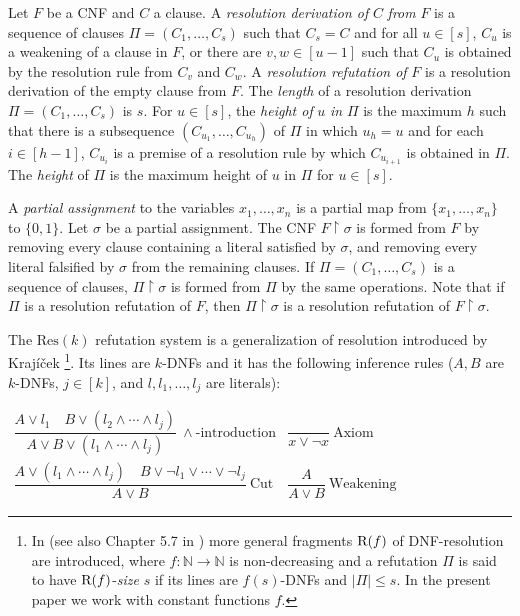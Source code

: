 Let $F$ be a CNF and $C$ a clause. A \emph{resolution derivation of} $C$ \emph{from} $F$ is a sequence of clauses $\Pi = (C_1, \ldots , C_s)$ such that $C_s = C$ and for all $u \in [s]$, $C_u$ is a weakening of a clause in $F$, or there are $v,w \in [u-1]$ such that $C_u$ is obtained by the resolution rule from $C_v$ and $C_w$. 
A \emph{resolution refutation of} $F$ is a resolution derivation of the empty clause from $F$.
The \emph{length} of a resolution derivation $\Pi = (C_1, \ldots , C_s)$ is $s$. 
For $u \in [s]$, the \emph{height of} $u$ \emph{in} $\Pi$ is the maximum $h$ such that there is a subsequence $(C_{u_1}, \ldots , C_{u_h})$ of $\Pi$ in which $u_h = u$ and for each $i \in [h-1]$, $C_{u_i}$ is a premise of a resolution rule by which $C_{u_{i+1}}$ is obtained in $\Pi$. 
The \emph{height} of $\Pi$ is the maximum height of $u$ in $\Pi$ for $u \in [s]$. 

 
A \emph{partial assignment} to the variables $x_1, \ldots , x_n$ is a partial map from $\{ x_1, \ldots , x_n \}$ to $\{0,1\}$. Let $\sigma$ be a partial assignment. The CNF $F \! \restriction \! \sigma$ is formed from $F$ by removing every clause containing a literal satisfied by $\sigma$, and removing every literal falsified by $\sigma$ from the remaining clauses. If $\Pi = (C_1, \ldots , C_s)$ is a sequence of clauses, $\Pi \!\restriction \! \sigma$ is formed from $\Pi$ by the same operations. Note that if $\Pi$ is a resolution refutation of $F$, then $\Pi \!\restriction \! \sigma$ is a resolution refutation of $F \!\restriction \! \sigma$. 

The $\text{Res}(k)$ refutation system is a generalization of resolution introduced by Kraj\'{i}\v{c}ek \cite{Krajicek2001}\footnote{In \cite{Krajicek2001} (see also Chapter 5.7 in \cite{Krajicek2019-book}) more general fragments $\textnormal{R}(f)$ of DNF-resolution are introduced, where $f:\mathbb{N} \rightarrow \mathbb{N}$ is non-decreasing and a refutation $\Pi$ is said to have $\textnormal{R}(f)$-\emph{size} $s$ if its lines are $f(s)$-DNFs and $|\Pi| \leq s$. In the present paper we work with constant functions $f$.}. 
Its lines are $k$-DNFs and it has the following inference rules ($A,B$ are $k$-DNFs, $j \in [k]$, and $l,l_1,\ldots, l_j$ are literals):
\begingroup
\renewcommand{\arraystretch}{2.5}
\begin{center}
$\begin{array}{cc}
\dfrac{A\lor l_1\quad B\lor(l_2\land\cdots\land l_j)}{A\lor B\lor(l_1\land\cdots\land l_j)}\ \land\text{-introduction}
&\dfrac{}{x\lor\neg x}\ \text{Axiom}\\
\dfrac{A\lor(l_1\land\cdots\land l_j)\quad B\lor\neg l_1\lor\cdots\lor\neg l_j}{A\lor B}\ \text{Cut}
&\dfrac{A}{A\lor B}\ \text{Weakening}
\end{array}$
\end{center}
\endgroup



















